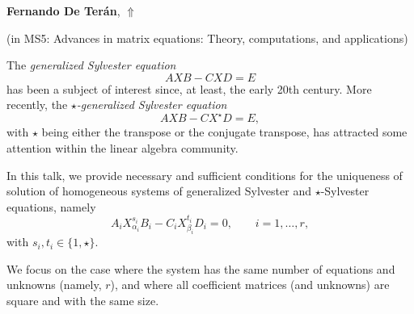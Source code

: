 \documentclass[ILAS2025-program.tex]{subfiles}
\begin{document}
     \hypertarget{down0319}{}\begin{ilasabstract}
    
    \textbf{Fernando De Terán},  \hfill \hyperlink{up0319}{$\Uparrow$}
    
    (in {\color{mstitle}MS5: Advances in matrix equations: Theory, computations, and applications})
        
        \mtskip
    The {\em generalized Sylvester equation}
$$
AXB-CXD=E
$$
has been a subject of interest since, at least, the early 20th century. More recently, the {\em$\star$-generalized Sylvester equation}
$$
AXB-CX^\star D=E,
$$
with $\star$ being either the transpose or the conjugate transpose, has attracted some attention within the linear algebra community.

In this talk, we provide necessary and sufficient conditions for the uniqueness of solution of homogeneous systems of generalized Sylvester and $\star$-Sylvester equations, namely
$$
A_iX_{\alpha_i}^{s_i}B_i-C_iX_{\beta_i}^{t_i}D_i=0,\qquad i=1,\hdots,r,
$$
with $s_i,t_i\in\{1,\star\}$. 

We focus on the case where the system has the same number of equations and unknowns (namely, $r$), and where all coefficient matrices (and unknowns) are square and with the same size.\end{ilasabstract}
\end{document}
